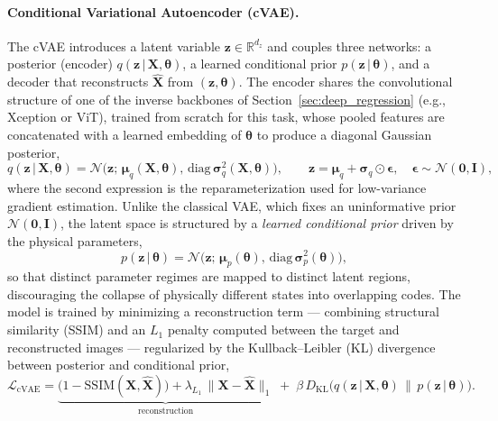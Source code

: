 \documentclass[letterpaper, 12, one column]{article}
\begin{document}
\paragraph{Conditional Variational Autoencoder (cVAE).}
The cVAE introduces a latent variable $\mathbf{z}\in\mathbb{R}^{d_z}$ and couples three networks: a posterior (encoder) $q(\mathbf{z}\,|\,\mathbf{X},\boldsymbol{\theta})$, a learned conditional prior $p(\mathbf{z}\,|\,\boldsymbol{\theta})$, and a decoder that reconstructs $\hat{\mathbf{X}}$ from $(\mathbf{z},\boldsymbol{\theta})$. The encoder shares the convolutional structure of one of the inverse backbones of Section~\ref{sec:deep_regression} (e.g., Xception or ViT), trained from scratch for this task, whose pooled features are concatenated with a learned embedding of $\boldsymbol{\theta}$ to produce a diagonal Gaussian posterior,
\begin{equation}
q(\mathbf{z}\,|\,\mathbf{X},\boldsymbol{\theta}) = \mathcal{N}\!\big(\mathbf{z};\,\boldsymbol{\mu}_q(\mathbf{X},\boldsymbol{\theta}),\,\mathrm{diag}\,\boldsymbol{\sigma}_q^2(\mathbf{X},\boldsymbol{\theta})\big),\qquad
\mathbf{z} = \boldsymbol{\mu}_q + \boldsymbol{\sigma}_q\odot\boldsymbol{\epsilon},\quad \boldsymbol{\epsilon}\sim\mathcal{N}(\mathbf{0},\mathbf{I}),
\label{eq:cvae_posterior}
\end{equation}
where the second expression is the reparameterization used for low-variance gradient estimation. Unlike the classical VAE, which fixes an uninformative prior $\mathcal{N}(\mathbf{0},\mathbf{I})$, the latent space is structured by a \emph{learned conditional prior} driven by the physical parameters,
\begin{equation}
p(\mathbf{z}\,|\,\boldsymbol{\theta}) = \mathcal{N}\!\big(\mathbf{z};\,\boldsymbol{\mu}_p(\boldsymbol{\theta}),\,\mathrm{diag}\,\boldsymbol{\sigma}_p^2(\boldsymbol{\theta})\big),
\label{eq:cvae_prior}
\end{equation}
so that distinct parameter regimes are mapped to distinct latent regions, discouraging the collapse of physically different states into overlapping codes. The model is trained by minimizing a reconstruction term --- combining structural similarity (SSIM) and an $L_1$ penalty computed between the target and reconstructed images --- regularized by the Kullback--Leibler (KL) divergence between posterior and conditional prior,
\begin{equation}
\mathcal{L}_{\mathrm{cVAE}} = \underbrace{\big(1-\mathrm{SSIM}(\mathbf{X},\hat{\mathbf{X}})\big) + \lambda_{L_1}\,\lVert \mathbf{X}-\hat{\mathbf{X}}\rVert_1}_{\text{reconstruction}} \;+\; \beta\,D_{\mathrm{KL}}\!\big(q(\mathbf{z}\,|\,\mathbf{X},\boldsymbol{\theta})\,\|\,p(\mathbf{z}\,|\,\boldsymbol{\theta})\big).
\label{eq:cvae_total_loss}
\end{equation}
\end{document}
